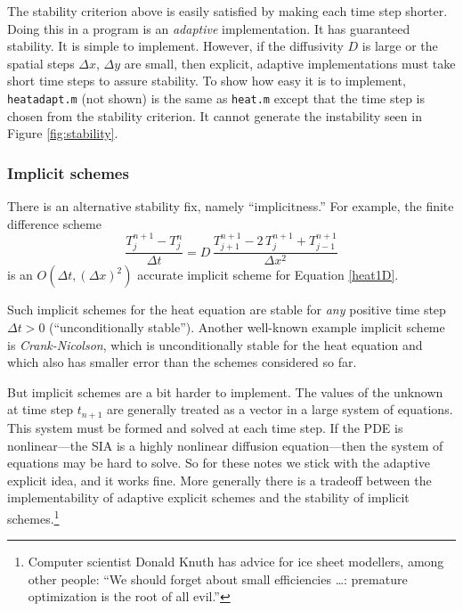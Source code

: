 \documentclass[titlepage,a4paper,final,12pt]{scrartcl}
\begin{document}
The stability criterion above is easily satisfied by making each time step shorter.  Doing this in a program is an \emph{adaptive} implementation.  It has guaranteed stability.  It is simple to implement.  However, if the diffusivity $D$ is large or the spatial steps $\Delta x$, $\Delta y$ are small, then explicit, adaptive implementations must take short time steps to assure stability.  To show how easy it is to implement, \texttt{heatadapt.m} (not shown) is the same as \texttt{heat.m} except that the time step is chosen from the stability criterion.  It cannot generate the instability seen in Figure \ref{fig:stability}.


\subsubsection*{Implicit schemes}  There is an alternative stability fix, namely ``implicitness.''  For example, the finite difference scheme
\begin{equation}
  \frac{T_j^{n+1} - T_j^n}{\Delta t} = D\,\frac{T_{j+1}^{n+1} - 2\, T_j^{n+1} + T_{j-1}^{n+1}}{\Delta x^2} \label{implicit1D}
\end{equation}
is an $O(\Delta t,(\Delta x)^2)$ accurate implicit scheme for Equation \eqref{heat1D}.

Such implicit schemes for the heat equation are stable for \emph{any} positive time step $\Delta t>0$ (``unconditionally stable'').  Another well-known example implicit scheme is \emph{Crank-Nicolson}, which is unconditionally stable for the heat equation and which also has smaller error than the schemes considered so far.

But implicit schemes are a bit harder to implement.  The values of the unknown at time step $t_{n+1}$ are generally treated as a vector in a large system of equations.  This system must be formed and solved at each time step.  If the PDE is nonlinear---the SIA is a highly nonlinear diffusion equation---then the system of equations may be hard to solve.  So for these notes we stick with the adaptive explicit idea, and it works fine.  More generally there is a tradeoff between the implementability of adaptive explicit schemes and the stability of implicit schemes.\footnote{Computer scientist Donald Knuth has advice for ice sheet modellers, among other people: ``We should forget about small efficiencies \dots: premature optimization is the root of all evil.''}
\end{document}
